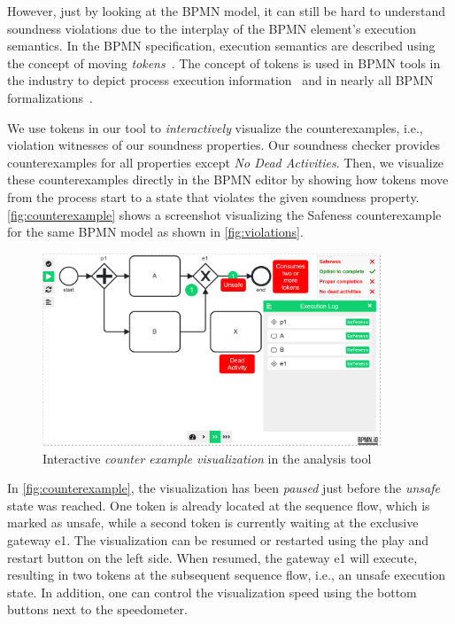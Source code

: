 \documentclass[runningheads]{llncs}
\begin{document}
However, just by looking at the BPMN model, it can still be hard to understand soundness violations due to the interplay of the BPMN element's execution semantics.
In the BPMN specification, execution semantics are described using the concept of moving \textit{tokens}~\cite{objectmanagementgroupBusinessProcessModel2013}.
The concept of tokens is used in BPMN tools in the industry to depict process execution information~\cite{camundaservicesgmbhBpmnjsTokenSimulation2024} and in nearly all BPMN formalizations~\cite{corradiniFormalApproachAnalysis2021,corradiniFormalisingAnimatingMultiple2022,houhouFirstOrderLogicVerification2022,krauterFormalizationAnalysisBPMN2023,krauterHigherorderTransformationApproach2023}.

We use tokens in our tool to \textit{interactively} visualize the counterexamples, i.e., violation witnesses of our soundness properties.
Our soundness checker provides counterexamples for all properties except \textit{No Dead Activities}.
Then, we visualize these counterexamples directly in the BPMN editor by showing how tokens move from the process start to a state that violates the given soundness property.
\autoref{fig:counterexample} shows a screenshot visualizing the Safeness counterexample for the same BPMN model as shown in \autoref{fig:violations}.

\begin{figure}[ht]
	\centering
	\includegraphics[width=0.9\textwidth]{images/counter-example}
	\caption{Interactive \textit{counter example visualization} in the analysis tool}
	\label{fig:counterexample}
\end{figure}

In \autoref{fig:counterexample}, the visualization has been \textit{paused} just before the \textit{unsafe} state was reached.
One token is already located at the sequence flow, which is marked as unsafe, while a second token is currently waiting at the exclusive gateway \textsf{e1}.
The visualization can be resumed or restarted using the play and restart button on the left side.
When resumed, the gateway \textsf{e1} will execute, resulting in two tokens at the subsequent sequence flow, i.e., an unsafe execution state.
In addition, one can control the visualization speed using the bottom buttons next to the speedometer.
\end{document}
